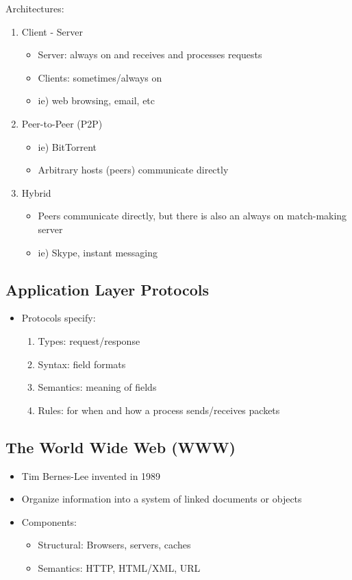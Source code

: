 \documentclass[11pt]{article}
\begin{document}
Architectures:
\begin{enumerate}
\item Client - Server
\begin{itemize}
\item Server: always on and receives and processes requests
\item Clients: sometimes/always on
\item ie) web browsing, email, etc
\end{itemize}
\item Peer-to-Peer (P2P)
\begin{itemize}
\item ie) BitTorrent
\item Arbitrary hosts (peers) communicate directly
\end{itemize}
\item Hybrid
\begin{itemize}
\item Peers communicate directly, but there is also an always on
match-making server
\item ie) Skype, instant messaging
\end{itemize}
\end{enumerate}

\subsection{Application Layer Protocols}
\label{sec:orgheadline146}
\begin{itemize}
\item Protocols specify:
\begin{enumerate}
\item Types: request/response
\item Syntax: field formats
\item Semantics: meaning of fields
\item Rules: for when and how a process sends/receives packets
\end{enumerate}
\end{itemize}

\subsection{The World Wide Web (WWW)}
\label{sec:orgheadline147}
\begin{itemize}
\item Tim Bernes-Lee invented in 1989
\item Organize information into a system of linked documents or objects
\item Components:
\begin{itemize}
\item Structural: Browsers, servers, caches
\item Semantics: HTTP, HTML/XML, URL
\end{itemize}
\end{itemize}
\end{document}
